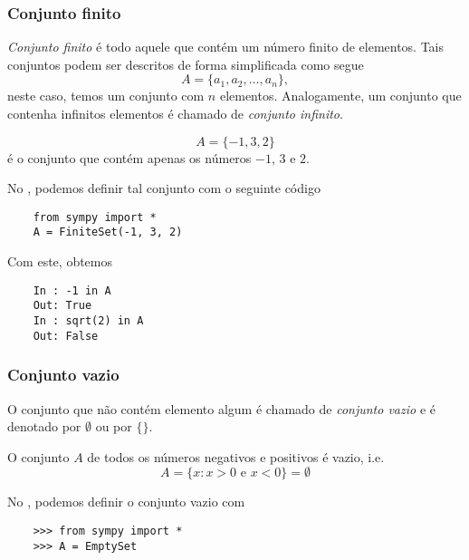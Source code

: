 \subsubsection{Conjunto finito}

\emph{Conjunto finito} é todo aquele que contém um número finito de elementos. Tais conjuntos podem ser descritos de forma simplificada como segue
\begin{equation}
  A = \{a_1, a_2, \ldots, a_n\},
\end{equation}
neste caso, temos um conjunto com $n$ elementos. Analogamente, um conjunto que contenha infinitos elementos é chamado de \emph{conjunto infinito}.

\begin{obs}
  \begin{equation}
    A = \{-1,3,2\}
  \end{equation}
  é o conjunto que contém apenas os números $-1$, $3$ e $2$.

  \ifispython
  No \python, podemos definir tal conjunto com o seguinte código
  \begin{lstlisting}
    from sympy import *
    A = FiniteSet(-1, 3, 2)
  \end{lstlisting}
  Com este, obtemos
  \begin{lstlisting}
    In : -1 in A
    Out: True
    In : sqrt(2) in A
    Out: False
  \end{lstlisting}
  \fi
\end{obs}

\subsubsection{Conjunto vazio}

O conjunto que não contém elemento algum é chamado de \emph{conjunto vazio} e é denotado por $\emptyset$ ou por $\{\}$.

\begin{ex}
  O conjunto $A$ de todos os números negativos e positivos é vazio, i.e.
  \begin{equation}
    A = \{x: x>0\text{ e }x<0\} = \emptyset
  \end{equation}

  \ifispython
  No \python, podemos definir o conjunto vazio com
  \begin{lstlisting}
    >>> from sympy import *
    >>> A = EmptySet
  \end{lstlisting}
  \fi
\end{ex}

